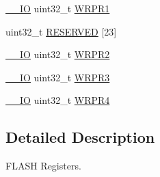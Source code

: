 \begin{DoxyCompactItemize}
\item 
\hyperlink{core__sc300_8h_aec43007d9998a0a0e01faede4133d6be}{\-\_\-\-\_\-\-I\-O} uint32\-\_\-t \hyperlink{struct_f_l_a_s_h___type_def_a8f94f0938663804b2d9de2002a4e7e67}{W\-R\-P\-R1}
\item 
uint32\-\_\-t \hyperlink{struct_f_l_a_s_h___type_def_ad381422d591d7595a9cb57bb87f70153}{R\-E\-S\-E\-R\-V\-E\-D} \mbox{[}23\mbox{]}
\item 
\hyperlink{core__sc300_8h_aec43007d9998a0a0e01faede4133d6be}{\-\_\-\-\_\-\-I\-O} uint32\-\_\-t \hyperlink{struct_f_l_a_s_h___type_def_a79b0e64b11e40d304573f0b501355aab}{W\-R\-P\-R2}
\item 
\hyperlink{core__sc300_8h_aec43007d9998a0a0e01faede4133d6be}{\-\_\-\-\_\-\-I\-O} uint32\-\_\-t \hyperlink{struct_f_l_a_s_h___type_def_ac04bb0c39c1419d049cb23e2c18240b3}{W\-R\-P\-R3}
\item 
\hyperlink{core__sc300_8h_aec43007d9998a0a0e01faede4133d6be}{\-\_\-\-\_\-\-I\-O} uint32\-\_\-t \hyperlink{struct_f_l_a_s_h___type_def_ab49b7f13f436cf3909e256646e330b78}{W\-R\-P\-R4}
\end{DoxyCompactItemize}


\subsection{Detailed Description}
F\-L\-A\-S\-H Registers. 

